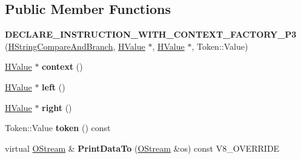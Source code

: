 \subsection*{Public Member Functions}
\begin{DoxyCompactItemize}
\item 
\hypertarget{classv8_1_1internal_1_1_h_string_compare_and_branch_a2ed055214a9c022e038fad08145cbba7}{}{\bfseries D\+E\+C\+L\+A\+R\+E\+\_\+\+I\+N\+S\+T\+R\+U\+C\+T\+I\+O\+N\+\_\+\+W\+I\+T\+H\+\_\+\+C\+O\+N\+T\+E\+X\+T\+\_\+\+F\+A\+C\+T\+O\+R\+Y\+\_\+\+P3} (\hyperlink{classv8_1_1internal_1_1_h_string_compare_and_branch}{H\+String\+Compare\+And\+Branch}, \hyperlink{classv8_1_1internal_1_1_h_value}{H\+Value} $\ast$, \hyperlink{classv8_1_1internal_1_1_h_value}{H\+Value} $\ast$, Token\+::\+Value)\label{classv8_1_1internal_1_1_h_string_compare_and_branch_a2ed055214a9c022e038fad08145cbba7}

\item 
\hypertarget{classv8_1_1internal_1_1_h_string_compare_and_branch_aafeb58cc5e50446ac329fbc65d807d55}{}\hyperlink{classv8_1_1internal_1_1_h_value}{H\+Value} $\ast$ {\bfseries context} ()\label{classv8_1_1internal_1_1_h_string_compare_and_branch_aafeb58cc5e50446ac329fbc65d807d55}

\item 
\hypertarget{classv8_1_1internal_1_1_h_string_compare_and_branch_a1d4ff067285c45a0213e7e3c445e2c7f}{}\hyperlink{classv8_1_1internal_1_1_h_value}{H\+Value} $\ast$ {\bfseries left} ()\label{classv8_1_1internal_1_1_h_string_compare_and_branch_a1d4ff067285c45a0213e7e3c445e2c7f}

\item 
\hypertarget{classv8_1_1internal_1_1_h_string_compare_and_branch_a9b8b4e8a7510a5be8bb0cf7d8763bc8b}{}\hyperlink{classv8_1_1internal_1_1_h_value}{H\+Value} $\ast$ {\bfseries right} ()\label{classv8_1_1internal_1_1_h_string_compare_and_branch_a9b8b4e8a7510a5be8bb0cf7d8763bc8b}

\item 
\hypertarget{classv8_1_1internal_1_1_h_string_compare_and_branch_af2f29e557add0f11fe8507fef0273a8b}{}Token\+::\+Value {\bfseries token} () const \label{classv8_1_1internal_1_1_h_string_compare_and_branch_af2f29e557add0f11fe8507fef0273a8b}

\item 
\hypertarget{classv8_1_1internal_1_1_h_string_compare_and_branch_acc5fd0a0de0d0c70abbf860b1b323d74}{}virtual \hyperlink{classv8_1_1internal_1_1_o_stream}{O\+Stream} \& {\bfseries Print\+Data\+To} (\hyperlink{classv8_1_1internal_1_1_o_stream}{O\+Stream} \&os) const V8\+\_\+\+O\+V\+E\+R\+R\+I\+D\+E\label{classv8_1_1internal_1_1_h_string_compare_and_branch_acc5fd0a0de0d0c70abbf860b1b323d74}


\end{DoxyCompactItemize}
